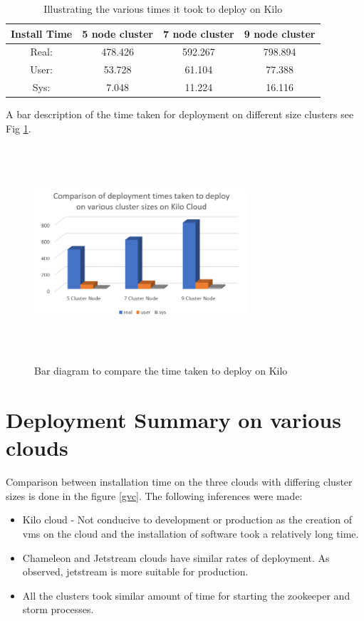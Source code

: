 \documentclass[9pt,twocolumn,twoside]{../../styles/osajnl}
\begin{document}
\begin{table}[!htb]
\centering
\caption{Illustrating the various times it took to deploy on Kilo}\label{T:timekilo}
\begin{center}
 \begin{tabular}{|c|| c c c|} 
 \hline
 Install Time &  5 node cluster & 7 node cluster & 9 node cluster\\ [0.5ex]
 \hline\hline
 Real: & 478.426 & 592.267 & 798.894 \\ 
 \hline
 User: & 53.728 & 61.104 & 77.388 \\
 \hline
 Sys: & 7.048 & 11.224 & 16.116 \\
 \hline
\end{tabular}
\end{center}
\end{table}

A bar description of the time taken for deployment on different size 
clusters see Fig \ref{i:timekilo}.

\begin{figure}[!htb]
  \includegraphics[width=8cm,height=8cm,keepaspectratio,width=\linewidth]{images/bar-3.png}
  \caption{Bar diagram to compare the time taken to deploy on Kilo}
  \label{i:timekilo}
\end{figure}

\section{Deployment Summary on various clouds}
Comparison between installation time on the three clouds with differing
cluster sizes is done in the figure \ref{gvc}. The following inferences 
were made:
\begin{itemize}
\item Kilo cloud - Not conducive to development or production as the
  creation of vms on the cloud and the installation of software took a
  relatively long time.
\item Chameleon and Jetstream clouds have similar rates of
  deployment. As observed, jetstream is more suitable for production.
\item All the clusters took similar amount of time for starting the
  zookeeper and storm processes.
\end{itemize}
\end{document}
